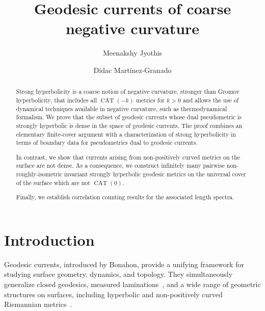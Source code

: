 \documentclass[12pt]{amsart}
\numberwithin{equation}{section}
\numberwithin{figure}{section}
\theoremstyle{definition}
\theoremstyle{plain}
\DeclareMathOperator{\CAT}{CAT}
\begin{document}
\title{Geodesic currents of coarse negative curvature}

\author[Jyothis]{Meenakshy Jyothis}
\address{Department of Mathematics\\
         University of Oklahoma\\
         601 Elm Ave Room 423, Norman, OK 73019\\
         USA}


\author[Martínez-Granado]{Dídac Martínez-Granado}
\address{Department of Mathematics\\University of Luxembourg\\Av. de la Fonte 6, Esch-sur-Alzette, L-4364, Luxembourg}       

\begin{abstract}
Strong hyperbolicity is a coarse notion of negative curvature, stronger than Gromov hyperbolicity, that includes all $\CAT(-k)$ metrics for $k>0$ and allows the use of dynamical techniques available in negative curvature, such as thermodynamical formalism. We prove that the subset of geodesic currents whose dual pseudometric is strongly hyperbolic is dense in the space of geodesic currents. The proof combines an elementary finite-cover argument with a characterization of strong hyperbolicity in terms of boundary data for pseudometrics dual to geodesic currents.

In contrast, we show that currents arising from non-positively curved metrics on the surface are not dense. As a consequence, we construct infinitely many pairwise non-roughly-isometric invariant strongly hyperbolic geodesic metrics on the universal cover of the surface which are not $\CAT(0)$.

Finally, we establish correlation counting results for the associated length spectra.
\end{abstract}

\maketitle



\section{Introduction}
Geodesic currents, introduced by Bonahon, provide a unifying framework for studying surface geometry, dynamics, and topology. 
They simultaneously generalize closed geodesics, measured laminations~\cite{Bonahon86:EndsHyperbolicManifolds,Bonahon88:GeodesicCurrent}, and a wide range of geometric structures on surfaces, including hyperbolic and non-positively curved Riemannian metrics~\cite{HP97:RigidityNegCurvedCone,CFF92:RigidityNonPosCurvedRiem,BL15:RigidityNonPosCurvedCone,Con18:MarkedNonpos}.
\end{document}
